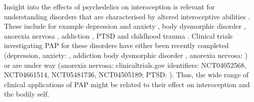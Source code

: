 \documentclass{article}
\begin{document}
Insight into the effects of psychedelics on interoception is relevant for understanding disorders that are characterised by altered interoceptive abilities \parencite{riva2018bodySelf, khalsa2018interoception, ho2020bodily-self-psy}.
These include for example depression and anxiety \parencite{dunn2010InterocepAnxDep, paulus2010interoception, pollatos2007interoceptiveAnxiety}, body dysmorphic disorder \parencite{pratt2014interoceptiveBDD}, anorexia nervosa \parencite{pollatos2016atypicalInteroAnorex, khalsa2015alteredInteroAnorexiaOriginal}, addiction \parencite{stewart2020interoceptiveAddicitonOUD_StUD, verdejo2012role_intero_add, angioletti2021interoception_add_mech}, PTSD and childhood trauma \parencite{neukirch2019ptsdInteroceptionYoga, harricharan2021traumaSensoryprocessing, schmitz2023ptsd_childtrauma_intero, schaan2019childhoodTraumaInteroception}. %
Clinical trials investigating PAP for these disorders have either been recently completed (depression, anxiety: \parencite{Grob2011-lt, ross2016rapid, Davis2020-vj, Carhart-Harris2021-escital, goodwin2022single, vonrotz2023single}, addiction \parencite{bogenschutz2022percentage, Johnson2014-qi} body dysmorphic disorder \parencite{schneier2023pilotBDDpsilo}, anorexia nervosa: \parencite{peck2023AnorexiaNervosapsilocybinPhase1Pilot}) or are under way (anorexia nervosa: \parencite{insert ref to CT search} clinicaltrials.gov identifiers: NCT04052568, NCT04661514, NCT05481736, NCT04505189; PTSD: \parencite{insert ref to CT search}). %
Thus, the wide range of clinical applications of PAP might be related to their effect on interoception and the bodily self.
\end{document}
